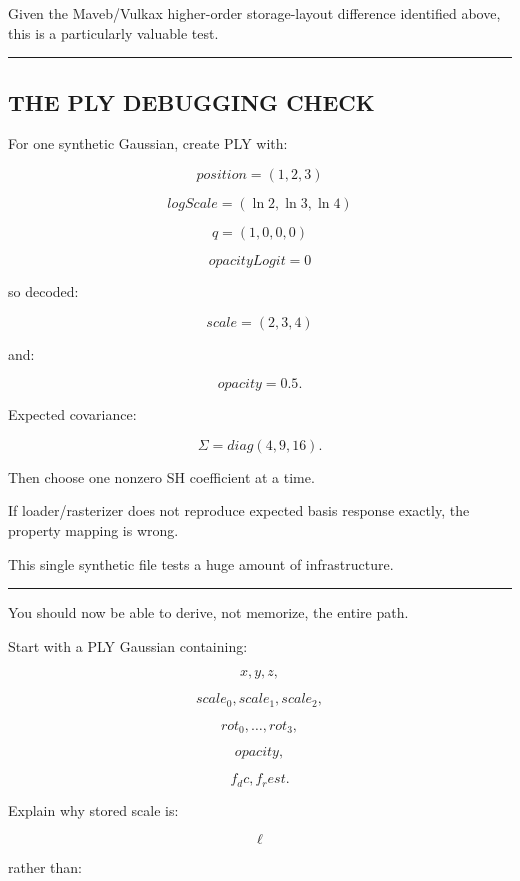 Given the Maveb/Vulkax higher-order storage-layout difference identified above, this is a particularly valuable test.

\begin{center}\rule{0.5\linewidth}{0.5pt}\end{center}

\subsection{THE PLY DEBUGGING CHECK}\label{04-visual-computing-ii-ch038-the-ply-debugging-check}

\hypertarget{04-visual-computing-ii-ch038-the-ply-debugging-check}{}

For one synthetic Gaussian, create PLY with:

\[
position=(1,2,3)
\]

\[
logScale=(\ln2,\ln3,\ln4)
\]

\[
q=(1,0,0,0)
\]

\[
opacityLogit=0
\]

so decoded:

\[
scale=(2,3,4)
\]

and:

\[
opacity=0.5.
\]

Expected covariance:

\[
\Sigma=
diag(
4,9,16
).
\]

Then choose one nonzero SH coefficient at a time.

If loader/rasterizer does not reproduce expected basis response exactly, the property mapping is wrong.

This single synthetic file tests a huge amount of infrastructure.

\begin{center}\rule{0.5\linewidth}{0.5pt}\end{center}

You should now be able to derive, not memorize, the entire path.

Start with a PLY Gaussian containing:

\[
x,y,z,
\]

\[
scale_0,scale_1,scale_2,
\]

\[
rot_0,\dots,rot_3,
\]

\[
opacity,
\]

\[
f_dc,
f_rest.
\]

Explain why stored scale is:

\[
\ell
\]

rather than:

